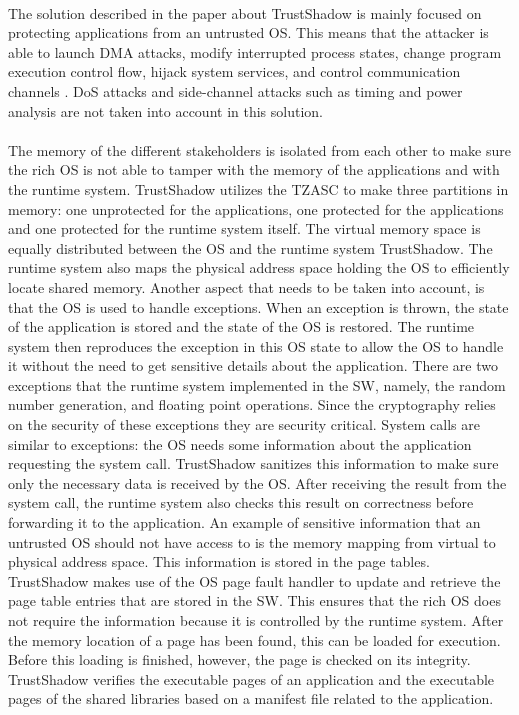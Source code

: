 \paragraph*{}
The solution described in the paper about TrustShadow is mainly focused on protecting applications from an untrusted OS. This means that the attacker is able to launch DMA attacks, modify interrupted process states, change program execution control flow, hijack system services, and control communication channels \cite{QiangChenyi2018CCAD}. DoS attacks and side-channel attacks such as timing and power analysis are not taken into account in this solution.

\paragraph*{}
The memory of the different stakeholders is isolated from each other to make sure the rich OS is not able to tamper with the memory of the applications and with the runtime system. TrustShadow utilizes the TZASC to make three partitions in memory: one unprotected for the applications, one protected for the applications and one protected for the runtime system itself. The virtual memory space is equally distributed between the OS and the runtime system TrustShadow. The runtime system also maps the physical address space holding the OS to efficiently locate shared memory. Another aspect that needs to be taken into account, is that the OS is used to handle exceptions. When an exception is thrown, the state of the application is stored and the state of the OS is restored. The runtime system then reproduces the exception in this OS state to allow the OS to handle it without the need to get sensitive details about the application. There are two exceptions that the runtime system implemented in the SW, namely, the random number generation, and floating point operations. Since the cryptography relies on the security of these exceptions they are security critical. System calls are similar to exceptions: the OS needs some information about the application requesting the system call. TrustShadow sanitizes this information to make sure only the necessary data is received by the OS. After receiving the result from the system call, the runtime system also checks this result on correctness before forwarding it to the application. An example of sensitive information that an untrusted OS should not have access to is the memory mapping from virtual to physical address space. This information is stored in the page tables. TrustShadow makes use of the OS page fault handler to update and retrieve the page table entries that are stored in the SW. This ensures that the rich OS does not require the information because it is controlled by the runtime system. After the memory location of a page has been found, this can be loaded for execution. Before this loading is finished, however, the page is checked on its integrity. TrustShadow verifies the executable pages of an application and the executable pages of the shared libraries based on a manifest file related to the application. 

